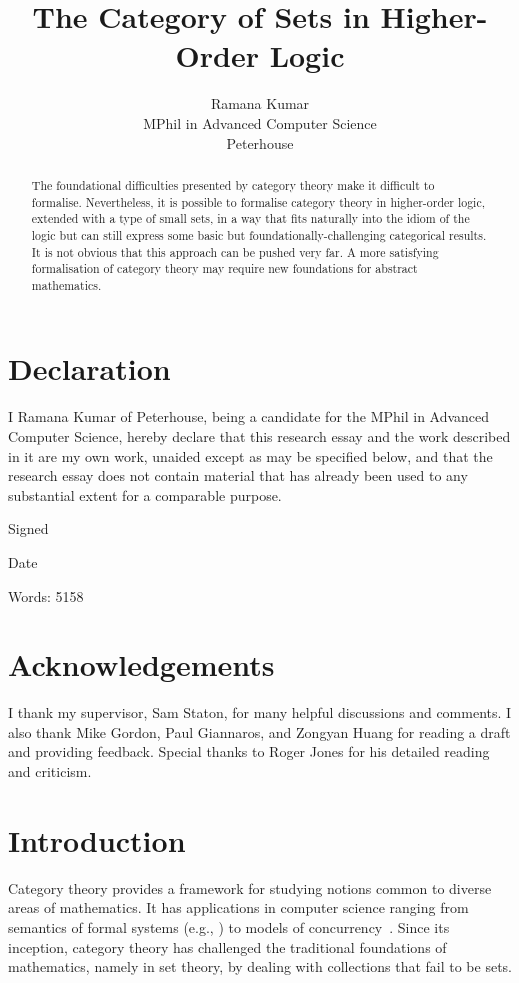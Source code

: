 \documentclass[twoside,titlepage,11pt]{article}
\title{The Category of Sets in Higher-Order Logic}
\author{Ramana Kumar\\MPhil in Advanced Computer Science\\Peterhouse}
\begin{document}
\maketitle
\section*{Declaration}%
\thispagestyle{empty}
I Ramana Kumar of Peterhouse, being a candidate for the MPhil in Advanced Computer Science, hereby declare that this research essay and the work described in it are my own work, unaided except as may be specified below, and that the research essay does not contain material that has already been used to any substantial extent for a comparable purpose.

\vspace{1em}
\noindent Signed

\vspace{1em}
\noindent Date

\vspace{2em}
\noindent Words: 5158
\vspace{5em}
\section*{Acknowledgements}%
I thank my supervisor, Sam Staton, for many helpful discussions and comments.
I also thank Mike Gordon, Paul Giannaros, and Zongyan Huang for reading a draft and providing feedback.
Special thanks to Roger Jones for his detailed reading and criticism.
\begin{abstract}%
The foundational difficulties presented by category theory make it difficult to formalise.
Nevertheless, it is possible to formalise category theory in higher-order logic, extended with a type of small sets, in a way that fits naturally into the idiom of the logic but can still express some basic but foundationally-challenging categorical results.
It is not obvious that this approach can be pushed very far.
A more satisfying formalisation of category theory may require new foundations for abstract mathematics.
\end{abstract}%
\section{Introduction}%
Category theory provides a framework for studying notions common to diverse areas of mathematics.
It has applications in computer science ranging from semantics of formal systems (e.g., \cite{CroleCT,JacobsCLTT}) to models of concurrency~\cite{DBLP:conf/csl/CattaniW96}.
Since its inception, category theory has challenged the traditional foundations of mathematics, namely in set theory, by dealing with collections that fail to be sets.
\end{document}
